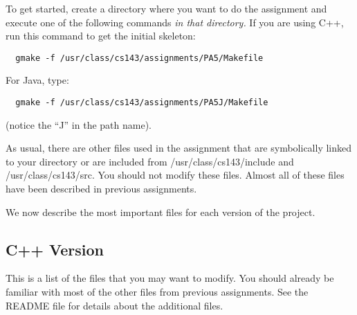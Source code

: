 \documentclass[11pt]{article}
\def\U#1{{\sf{}#1}}
\begin{document}
To get started, create a directory where you want to do the assignment
and execute one of the following commands {\em in that directory.}
If you are using C++, run this command to get the initial
skeleton:
\begin{verbatim}
  gmake -f /usr/class/cs143/assignments/PA5/Makefile
\end{verbatim}
For Java, type:
\begin{verbatim}
  gmake -f /usr/class/cs143/assignments/PA5J/Makefile
\end{verbatim}
(notice the ``J'' in the path name).

As usual, there are other files used in the assignment that are
symbolically linked to your directory or are included from \U{/usr/class/cs143/include}
and \U{/usr/class/cs143/src}.  You should not modify these
files.  Almost all of these files have been described in previous
assignments.

We now describe the most important files for each version of the
project.

\subsection{C++ Version}

This is a list of the files that you may want to modify.
You should already be familiar with most of the other files from previous assignments.
See the \U{README} file for details about the additional
files.
\end{document}
